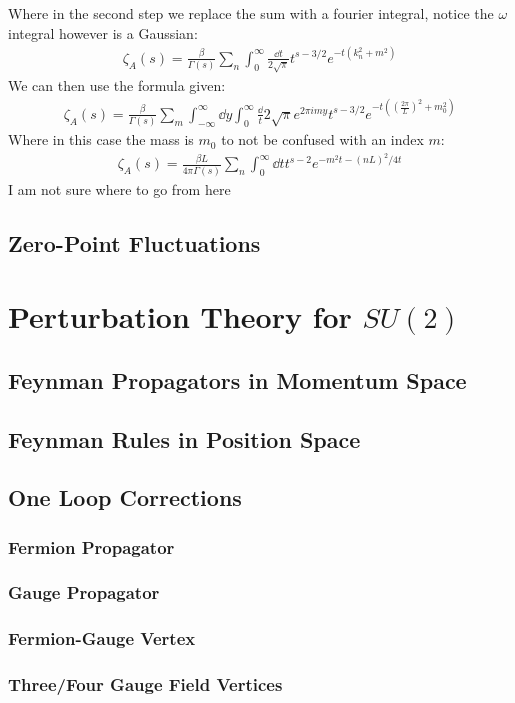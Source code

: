 \documentclass[12pt]{article}
\begin{document}
Where in the second step we replace the sum with a fourier integral, notice the $\omega$ integral however is a Gaussian:
\begin{align*}
  \zeta_A(s)=\frac{\beta}{\Gamma(s)}\sum_{n}\int_0^\infty
  \frac{\dd{t}}{2\sqrt\pi}t^{s-3/2}e^{-t(k_n^2+m^2)}
\end{align*}
We can then use the formula given:
\begin{align*}
  \zeta_A(s)=\frac{\beta}{\Gamma(s)}\sum_m\int_{-\infty}^\infty\dd{y}
  \int_0^\infty\frac\dd{t}{2\sqrt\pi}e^{2\pi imy}t^{s-3/2}
  e^{-t((\frac{2\pi}{L})^2+m_0^2)}
\end{align*}
Where in this case the mass is $m_0$ to not be confused with an index $m$:
\begin{align*}
  \zeta_A(s)=\frac{\beta L}{4\pi\Gamma(s)}\sum_n  \int_0^\infty
  \dd{t}t^{s-2} e^{-m^2t-(nL)^2/4t}
\end{align*}
I am not sure where to go from here
\subsection{Zero-Point Fluctuations}

\section{Perturbation Theory for $SU(2)$}

\subsection{Feynman Propagators in Momentum Space}

\subsection{Feynman Rules in Position Space}

\subsection{One Loop Corrections}

\subsubsection{Fermion Propagator}

\subsubsection{Gauge Propagator}

\subsubsection{Fermion-Gauge Vertex}

\subsubsection{Three/Four Gauge Field Vertices}
\end{document}
